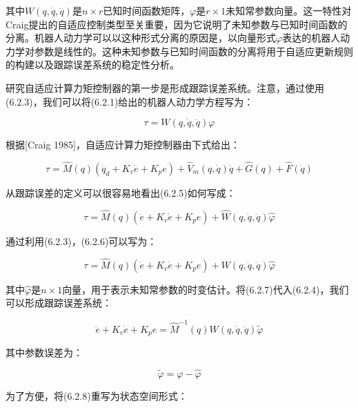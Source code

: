 \documentclass[12pt,a4paper]{ctexart}
\begin{document}
其中$W(q, \dot{q}, \ddot{q})$是$n \times r$已知时间函数矩阵，$\varphi$是$r \times 1$未知常参数向量。这一特性对Craig提出的自适应控制类型至关重要，因为它说明了未知参数与已知时间函数的分离。机器人动力学可以以这种形式分离的原因是，以向量形式$\varphi$表达的机器人动力学对参数是线性的。这种未知参数与已知时间函数的分离将用于自适应更新规则的构建以及跟踪误差系统的稳定性分析。

研究自适应计算力矩控制器的第一步是形成跟踪误差系统。注意，通过使用(6.2.3)，我们可以将(6.2.1)给出的机器人动力学方程写为：

\begin{equation}\label{eq:torque-dynamics}
\tau = W(q, \dot{q}, \ddot{q}) \varphi
\end{equation}

根据[Craig 1985]，自适应计算力矩控制器由下式给出：

\begin{equation}\label{eq:adaptive-controller}
\tau = \hat{M}(q)(\ddot{q}_d + K_v \dot{e} + K_p e) + \hat{V}_m(q, \dot{q})\dot{q} + \hat{G}(q) + \hat{F}(\dot{q})
\end{equation}

从跟踪误差的定义可以很容易地看出(6.2.5)如何写成：

\begin{equation}
\tau = \hat{M}(q)(\ddot{e} + K_v \dot{e} + K_p e) + \hat{W}(q, \dot{q}, \ddot{q}) \hat{\varphi}
\end{equation}

通过利用(6.2.3)，(6.2.6)可以写为：

\begin{equation}
\tau = \hat{M}(q)(\ddot{e} + K_v \dot{e} + K_p e) + W(q, \dot{q}, \ddot{q}) \hat{\varphi}
\end{equation}

其中$\hat{\varphi}$是$n \times 1$向量，用于表示未知常参数的时变估计。将(6.2.7)代入(6.2.4)，我们可以形成跟踪误差系统：

\begin{equation}\label{eq:error-system}
\ddot{e} + K_v \dot{e} + K_p e = \hat{M}^{-1}(q) W(q, \dot{q}, \ddot{q}) \tilde{\varphi}
\end{equation}

其中参数误差为：

\begin{equation}\label{eq:param-error}
\tilde{\varphi} = \varphi - \hat{\varphi}
\end{equation}

为了方便，将(6.2.8)重写为状态空间形式：
\end{document}
